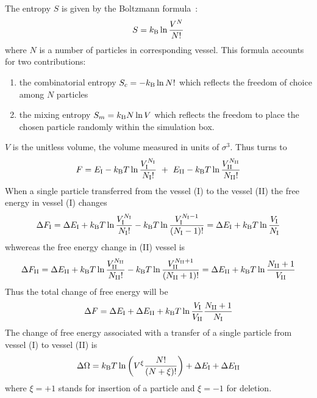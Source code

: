 \documentclass{elsarticle}
\begin{document}
The entropy $S$ is given by the Boltzmann formula~\cite{Nagle2004}:
\begin{equation}
    S=k_\mathrm{B}\ln\frac{V^{N}}{N!}\label{eq:entropy}
\end{equation}
where $N$ is a number of particles in corresponding vessel.
This formula accounts for two contributions:
\begin{enumerate}
    \item the combinatorial entropy $S_{c}=-k_\mathrm{B}\ln N!$ which reflects the freedom of choice among $N$ particles
    \item the mixing entropy $S_{m}=k_\mathrm{B} N\ln V$ which reflects the freedom to place the chosen particle randomly within the simulation box. 
\end{enumerate}
$V$ is the unitless volume, \ie the volume measured in units of $\sigma^3$. 
Thus  turns to 
\begin{equation}
    F=\EI-\kT\ln\frac{\VI^{\NI}}{\NI!}\ + \ \EII-\kT\ln\frac{\VII ^{\NII}}{{\NII} !}
\label{eq: F_gibbs}
\end{equation}
When a single particle transferred from the vessel (I) to the  vessel (II) the free energy in vessel (I) changes 
\begin{equation}
\Delta F_{\mathrm{I}} = \Delta E_{\mathrm{I}}+k_\mathrm{B}T\ln\frac{V_{\mathrm{I}}^{N_{\mathrm{I}}}}{N_{\mathrm{I}} !} - k_\mathrm{B}T\ln\frac{V_{\mathrm{I}}^{N_{\mathrm{I}}-1}}{(N_{\mathrm{I}}-1)!}=\Delta E_{\mathrm{I}} + k_\mathrm{B}T\ln\frac{V_{\mathrm{I}}}{N_{\mathrm{I}}}
\end{equation}
whwereas the free energy change in (II) vessel is
\begin{equation}
\Delta F_{\mathrm{II}} = \Delta E_{\mathrm{II}}+k_\mathrm{B}T\ln\frac{V_{\mathrm{II}}^{N_{\mathrm{II}}}}{N_{\mathrm{II}} !} - k_\mathrm{B}T\ln\frac{V_{\mathrm{II}}^{N_{\mathrm{II}}+1}}{(N_{\mathrm{II}}+1)!}=\Delta E_{\mathrm{II}} + k_\mathrm{B}T\ln\frac{N_{\mathrm{II}}+1}{V_{\mathrm{II}}}
\end{equation}
Thus the total change of free energy will be 
\begin{equation}
\Delta F = \Delta E_{\mathrm{I}}+\Delta E_{\mathrm{II}}+k_\mathrm{B}T\ln\frac{V_{\mathrm{I}}}{V_{\mathrm{II}}}\frac{N_{\mathrm{II}}+1}{N_{\mathrm{I}}}
\end{equation}
The change of free energy associated with a transfer of a single particle from vessel (I) to vessel (II)  is
\begin{equation}
    \Delta\Omega=k_\mathrm{B}T\ln\left(V^{\xi}\frac{N!}{\left(N+\xi\right)!}\right)+\Delta E_{\mathrm{I}}+\Delta E_{\mathrm{II}}
\label{eq: DeltaG GC}
\end{equation}
where $\xi=+1$ stands for insertion of a particle and $\xi=-1$ for deletion.
\end{document}
